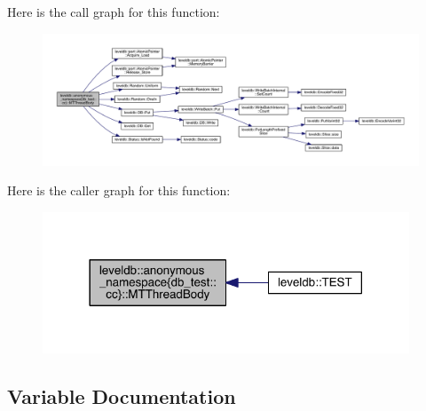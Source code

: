 Here is the call graph for this function\+:
\nopagebreak
\begin{figure}[H]
\begin{center}
\leavevmode
\includegraphics[width=350pt]{namespaceleveldb_1_1anonymous__namespace_02db__test_8cc_03_a6339412a93f4350fbce4b929bc59fe4f_cgraph}
\end{center}
\end{figure}




Here is the caller graph for this function\+:
\nopagebreak
\begin{figure}[H]
\begin{center}
\leavevmode
\includegraphics[width=310pt]{namespaceleveldb_1_1anonymous__namespace_02db__test_8cc_03_a6339412a93f4350fbce4b929bc59fe4f_icgraph}
\end{center}
\end{figure}




\subsection{Variable Documentation}
\hypertarget{namespaceleveldb_1_1anonymous__namespace_02db__test_8cc_03_a27ae32b8ef5b6166eb680ef2740ac7f7}{}

